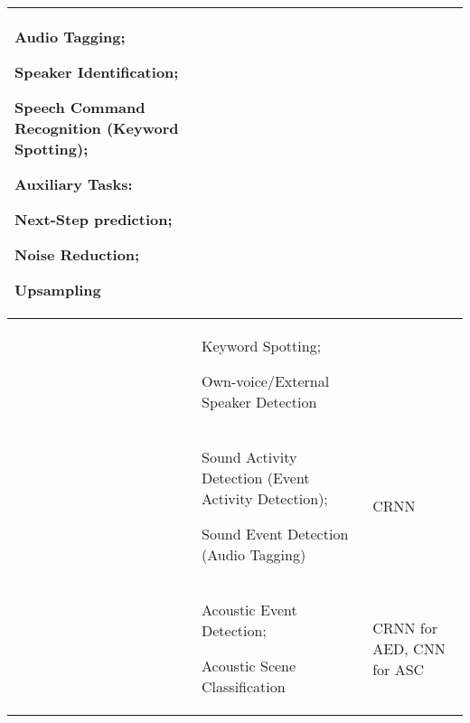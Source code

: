 \begin{table}[ht]
\begin{tabular}{p{}p{}p{}}
			Audio Tagging; 
			
			Speaker Identification; 
			
			Speech Command Recognition (Keyword Spotting); 
			
			\textbf{Auxiliary Tasks: }
			
			Next-Step prediction; 
			
			Noise Reduction; 
			
			Upsampling &  \\ \hline
			\citet{lopez2019keyword} & Keyword Spotting; 
			
			Own-voice/External Speaker Detection & \\ \hline
			\citet{pankajakshan2019polyphonic} & Sound Activity Detection (Event Activity Detection); 
			
			Sound Event Detection (Audio Tagging) & CRNN \\ \hline
			\citet{tonami2019joint} & Acoustic Event Detection; 
			
			Acoustic Scene Classification & CRNN for AED, CNN for ASC  \\ \hline
		\end{tabular}
		\label{table:combinations} %
	\end{table}
	
